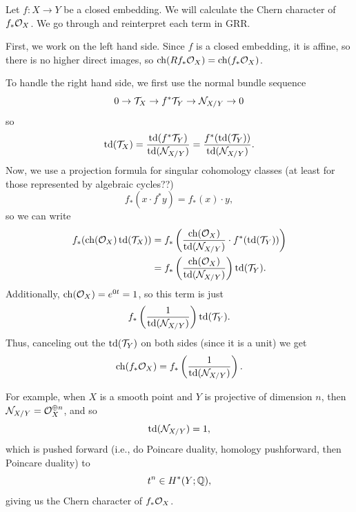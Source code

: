 \documentclass[12pt]{article}
\DeclareMathOperator{\chern}{ch}
\DeclareMathOperator{\todd}{td}
\begin{document}
\begin{eg}
    Let $f:X\to Y$ be a closed embedding. We will calculate the Chern character of $f_*\mathcal{O}_X$. We go through and reinterpret each term in GRR.
    
    First, we work on the left hand side. Since $f$ is a closed embedding, it is affine, so there is no higher direct images, so $\chern(Rf_* \cO_X) = \chern(f_* \cO_X)$.

    To handle the right hand side, we first use the normal bundle sequence
    \[0\to \mathcal{T}_X \to f^*\mathcal{T}_Y \to \mathcal{N}_{X/Y} \to 0\]
    so
    \[\todd(\cT_X) = \frac{\todd(f^* \cT_Y)}{\todd(\cN_{X/Y})} = \frac{f^*(\todd(\cT_Y))}{\todd(\cN_{X/Y})}.\]
    Now, we use a projection formula for singular cohomology classes (at least for those represented by algebraic cycles??)
    \[f_*(x \cdot f^* y) = f_*(x) \cdot y,\]
    so we can write
    \begin{align*}
        f_*(\chern(\cO_X)\todd(\cT_X)) &= f_*\left(\frac{\chern(\cO_X)}{\todd(\cN_{X/Y})}\cdot f^*(\todd(\cT_Y))\right)\\
        &= f_*\left(\frac{\chern(\cO_X)}{\todd(\cN_{X/Y})}\right) \todd(\cT_Y).
    \end{align*}
    Additionally, $\chern(\cO_X)=e^{0t}=1$, so this term is just
    \[f_*\left(\frac{1}{\todd(\cN_{X/Y})}\right) \todd(\cT_Y).\]
    Thus, canceling out the $\todd(\cT_Y)$ on both sides (since it is a unit) we get
    \[\chern(f_* \cO_X) = f_*\left(\frac{1}{\todd(\cN_{X/Y})}\right).\]

    For example, when $X$ is a smooth point and $Y$ is projective of dimension $n$, then $\mathcal{N}_{X/Y} = \mathcal{O}_X^{\oplus n}$, and so
    \[\todd(\cN_{X/Y}) = 1,\]
    which is pushed forward (i.e., do Poincare duality, homology pushforward, then Poincare duality) to
    \[t^n \in H^*(Y;\mathbb{Q}),\]
    giving us the Chern character of $f_*\mathcal{O}_X$.
\end{eg}

\nocite{*} %
\end{document}
